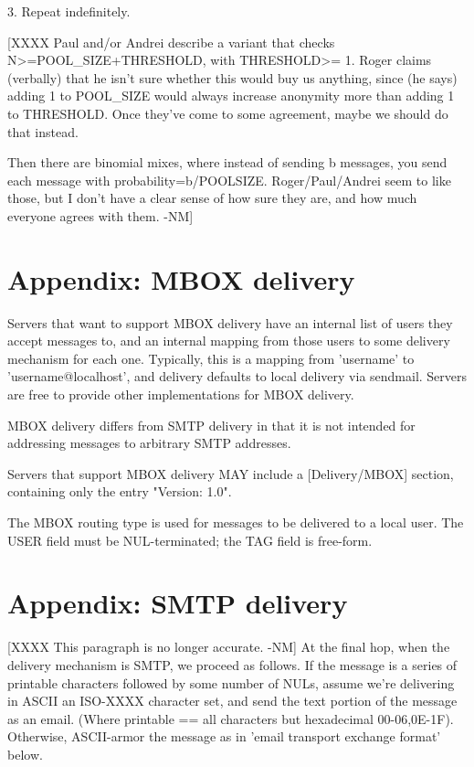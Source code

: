 3. Repeat indefinitely.

[XXXX 
   Paul and/or Andrei describe a variant that checks N>=POOL_SIZE+THRESHOLD, 
   with THRESHOLD>= 1.  Roger claims (verbally) that he isn't sure whether
   this would buy us anything, since (he says) adding 1 to POOL_SIZE would
   always increase anonymity more than adding 1 to THRESHOLD.  Once they've
   come to some agreement, maybe we should do that instead.

   Then there are binomial mixes, where instead of sending b messages,
   you send each message with probability=b/POOLSIZE.  Roger/Paul/Andrei
   seem to like those, but I don't have a clear sense of how sure they are,
   and how much everyone agrees with them. -NM]
  
\section{Appendix: MBOX delivery}

Servers that want to support MBOX delivery have an internal list of
users they accept messages to, and an internal mapping from those
users to some delivery mechanism for each one.  Typically, this is a
mapping from 'username' to 'username@localhost', and delivery defaults
to local delivery via sendmail.  Servers are free to provide other
implementations for MBOX delivery.

MBOX delivery differs from SMTP delivery in that it is not intended
for addressing messages to arbitrary SMTP addresses.

Servers that support MBOX delivery MAY include a [Delivery/MBOX]
section, containing only the entry "Version: 1.0".

The MBOX routing type is used for messages to be delivered to a local
user.  The USER field must be NUL-terminated; the TAG field is
free-form. 

\section{Appendix: SMTP delivery}

[XXXX This paragraph is no longer accurate. -NM]
At the final hop, when the delivery mechanism is SMTP, we proceed as
follows.  If the message is a series of printable characters followed
by some number of NULs, assume we're delivering in ASCII an ISO-XXXX
character set, and send the text portion of the message as an email.
(Where printable == {all characters but hexadecimal 00-06,0E-1F}).
Otherwise, ASCII-armor the message as in 'email transport exchange
format' below.

